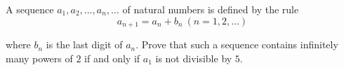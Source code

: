 A sequence $a_1,a_2,\ldots ,a_n,\ldots$ of natural numbers is defined by the rule\[a_{n+1}=a_n+b_n\ (n=1,2,\ldots)\]

where $b_n$ is the last digit of $a_n$. Prove that such a sequence contains infinitely many powers of $2$ if and only if $a_1$ is not divisible by $5$.